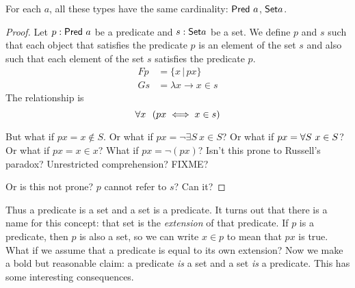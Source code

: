 \begin{mthm}
    For each $a$, all these types have the same cardinality:
    $\mathsf{Pred}~a$, $\textsf{Set}{a}$.
    \begin{proof}
        Let $p : \mathsf{Pred}~a$ be a predicate and $s : \textsf{Set}{a}$ be a set.
        We define $p$ and $s$ such that each object that satisfies the predicate $p$ is an element of the set $s$
        and also such that each element of the set $s$ satisfies the predicate $p$.
        \begin{align*}
            F p &= \{ x \,|\, p x \}
            \\
            G s &= \lambda x \to x \in s
        \end{align*}
        The relationship is
        \[ \forall x~~ (p x \iff x \in s) \]

        But what if $p x = x \not\in S$.
        Or what if $p x = \neg\exists S ~ x \in S$?
        Or what if $p x = \forall S~ x \in S$?
        Or what if $p x = x \in x$?
        What if $p x = \neg (p x)$?
        Isn't this prone to Russell's paradox?
        Unrestricted comprehension?
        FIXME?

        Or is this not prone?
        $p$ cannot refer to $s$?
        Can it?
    \end{proof}
\end{mthm}

Thus a predicate is a set and a set is a predicate.
It turns out that there is a name for this concept:
that set is the \emph{extension} of that predicate.
If $p$ is a predicate, then $p$ is also a set,
so we can write $x \in p$ to mean that $p x$ is true.
What if we assume that a predicate is equal to its own extension?
Now we make a bold but reasonable claim:
a predicate \emph{is} a set and a set \emph{is} a predicate.
This has some interesting consequences.


